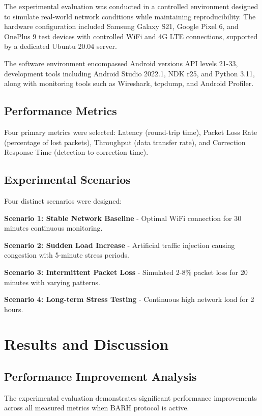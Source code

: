 \documentclass[conference]{IEEEtran}
\begin{document}
The experimental evaluation was conducted in a controlled environment designed to simulate real-world network conditions while maintaining reproducibility. The hardware configuration included Samsung Galaxy S21, Google Pixel 6, and OnePlus 9 test devices with controlled WiFi and 4G LTE connections, supported by a dedicated Ubuntu 20.04 server.

The software environment encompassed Android versions API levels 21-33, development tools including Android Studio 2022.1, NDK r25, and Python 3.11, along with monitoring tools such as Wireshark, tcpdump, and Android Profiler.

\subsection{Performance Metrics}

Four primary metrics were selected: Latency (round-trip time), Packet Loss Rate (percentage of lost packets), Throughput (data transfer rate), and Correction Response Time (detection to correction time).

\subsection{Experimental Scenarios}

Four distinct scenarios were designed:

\textbf{Scenario 1: Stable Network Baseline} - Optimal WiFi connection for 30 minutes continuous monitoring.

\textbf{Scenario 2: Sudden Load Increase} - Artificial traffic injection causing congestion with 5-minute stress periods.

\textbf{Scenario 3: Intermittent Packet Loss} - Simulated 2-8\% packet loss for 20 minutes with varying patterns.

\textbf{Scenario 4: Long-term Stress Testing} - Continuous high network load for 2 hours.

\section{Results and Discussion}

\subsection{Performance Improvement Analysis}

The experimental evaluation demonstrates significant performance improvements across all measured metrics when BARH protocol is active.
\end{document}
